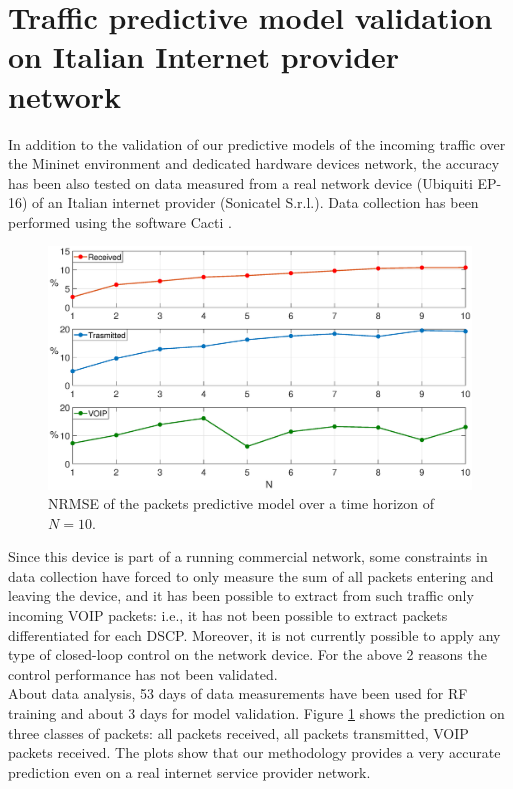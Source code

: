 \section{Traffic predictive model validation on Italian Internet provider network}
In addition to the validation of our predictive models of the incoming traffic over the Mininet environment and dedicated hardware devices network, the accuracy has been also tested on data measured from a real network device (Ubiquiti EP-16) of an Italian internet provider (Sonicatel S.r.l.). Data collection has been performed using the software Cacti \cite{Cacti}.\\
\begin{figure}[H]
	\centering
	\includegraphics[trim={120 0 120 0}, width=1\linewidth]{figure/Error_PESCARA_DATA.eps}
	\caption{NRMSE of the packets predictive model over a time horizon of $N=10$.}
	\label{fig:{errorPescara}}
\end{figure}
Since this device is part of a running commercial network, some constraints in data collection have forced to only measure the sum of all packets entering and leaving the device, and it has been possible to extract from such traffic only incoming VOIP packets: i.e., it has not been possible to extract packets differentiated for each DSCP. Moreover, it is not currently possible to apply any type of closed-loop control on the network device. For the above 2 reasons the control performance has not been validated.\\
About data analysis, 53 days of data measurements have been used for RF training and about 3 days for model validation. Figure \ref{fig:{errorPescara}} shows the prediction on three classes of packets: all packets received, all packets transmitted, VOIP packets received. The plots show that our methodology provides a very accurate prediction even on a real internet service provider network.\\
